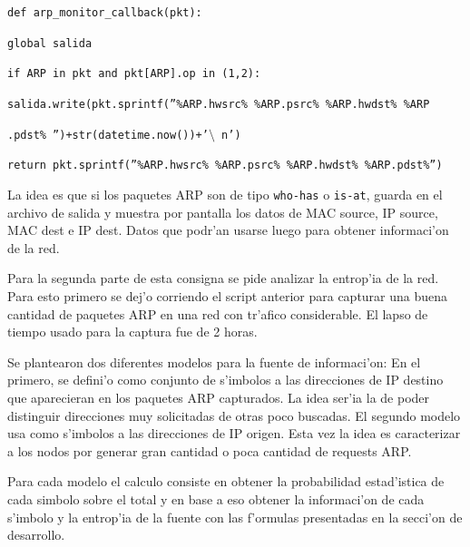 \documentclass[a4paper,10pt]{article}
\begin{document}
\vspace*{5 mm}

\texttt{def arp\_monitor\_callback(pkt):}

\hspace*{3 mm}	\texttt{global salida}
	
\hspace*{3 mm}	\texttt{if ARP in pkt and pkt[ARP].op in (1,2):}
		
\hspace*{6 mm}			\texttt{salida.write(pkt.sprintf(''\%ARP.hwsrc\% \%ARP.psrc\% \%ARP.hwdst\% \%ARP}
			
\hspace*{6 mm}			\texttt{.pdst\% '')+str(datetime.now())+'$\setminus$ n')}
			
\hspace*{6 mm}			\texttt{return pkt.sprintf(''\%ARP.hwsrc\% \%ARP.psrc\% \%ARP.hwdst\% \%ARP.pdst\%'')}

\vspace*{5 mm}

La idea es que si los paquetes ARP son de tipo \texttt{who-has} o \texttt{is-at}, guarda en el archivo de salida y muestra por pantalla los datos de MAC source, IP source, MAC dest e IP dest. Datos que podr'an usarse luego para obtener informaci'on de la red.

\vspace*{5 mm}

Para la segunda parte de esta consigna se pide analizar la entrop'ia de la red. Para esto primero se dej'o corriendo el script anterior para capturar una buena cantidad de paquetes ARP en una red con tr'afico considerable. El lapso de tiempo usado para la captura fue de 2 horas. 

\vspace*{5 mm}

Se plantearon dos diferentes modelos para la fuente de informaci'on: En el primero, se defini'o como conjunto de s'imbolos a las direcciones de IP destino que aparecieran en los paquetes ARP capturados. La idea ser'ia la de poder distinguir direcciones muy solicitadas de otras poco buscadas. El segundo modelo usa como s'imbolos a las direcciones de IP origen. Esta vez la idea es caracterizar a los nodos por generar gran cantidad o poca cantidad de requests ARP.

\vspace*{5 mm}

Para cada modelo el calculo consiste en obtener la probabilidad estad'istica de cada simbolo sobre el total y en base a eso obtener la informaci'on de cada s'imbolo y la entrop'ia de la fuente con las f'ormulas presentadas en la secci'on de desarrollo.
\end{document}
